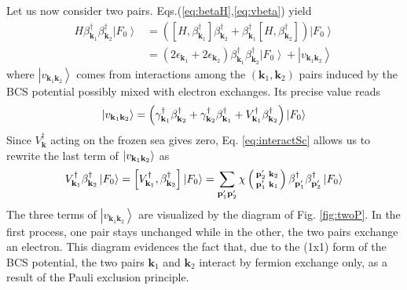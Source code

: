 \documentclass[aps,prb,superscriptaddress,twocolumn]{revtex4}
\newcommand{\vk}{\ensuremath{\mathbf{k}}}
\newcommand{\vp}{\ensuremath{\mathbf{p}}}
\begin{document}
Let us now consider two pairs. Eqs.(\ref{eq:betaH},\ref{eq:vbeta}) yield 
\begin{equation}  \label{eq:SchTwo}
\begin{split}
H\beta^{\dagger}_{\mathbf{k} _1}\beta^{\dagger}_{\mathbf{k}
_2}\left|F_0\right>   &=\left(\left[H,\beta^{\dagger}_{\mathbf{k} _1}\right]
\beta^{\dagger}_{\mathbf{k} _2}+\beta^{\dagger}_{\mathbf{k} _1}\left[%
H,\beta^{\dagger}_{\mathbf{k} _2}\right]  \right) \left|F_0\right>   \\
&=\left(2\epsilon_{\mathbf{k} _1}+2\epsilon_{\mathbf{k} _2}\right)
\beta^{\dagger}_{\mathbf{k} _1}\beta^{\dagger}_{\mathbf{k}
_2}\left|F_0\right>  +\left|v_{\mathbf{k} _1\mathbf{k} _2}\right> 
\end{split}%
\end{equation}
where $\left|v_{\mathbf{k} _1\mathbf{k} _2}\right> $ comes from interactions
among the $\left(\mathbf{k} _1,\mathbf{k} _2\right) $ pairs induced by the
BCS potential possibly mixed with electron exchanges. Its precise value reads 
\begin{equation}
\left|v_{\mathbf{k} _1\mathbf{k} _2}\right> =\left(\gamma^{\dagger}_{\mathbf{%
k} _1}\beta^{\dagger}_{\mathbf{k} _2}+\gamma^{\dagger}_{\mathbf{k}
_2}\beta^{\dagger}_{\mathbf{k} _1}+V^{\dagger}_{\mathbf{k}
_1}\beta^{\dagger}_{\mathbf{k} _2}\right) \left|F_0\right>  
\end{equation}
Since $V^{\dagger}_{\mathbf{k}}$ acting on the frozen sea gives zero,  Eq. \eqref{eq:interactSc} allows us to rewrite the last term of $\left|v_{%
\mathbf{k} _1\mathbf{k} _2}\right> $ as 
\begin{equation}
V^{\dagger}_{\mathbf{k} _1}\beta^{\dagger}_{\mathbf{k} _2}\left|F_0\right>  =%
\left[V^{\dagger}_{\mathbf{k} _1},\beta^{\dagger}_{\mathbf{k} _2}\right] 
\left|F_0\right>  = \sum_{\mathbf{p} ^{\prime}_1\mathbf{p}
^{\prime}_2}\chi\left(\begin{smallmatrix}\vp'_2&\vk_2\\\vp'_1&\vk_1%
\end{smallmatrix}\right)  \beta^{\dagger}_{\mathbf{p} ^{\prime}_1}\beta^{%
\dagger}_{\mathbf{p} ^{\prime}_2}\left|F_0\right>  
\end{equation}
The three terms of  $\left|v_{\mathbf{k} _1\mathbf{k} _2}\right> $ are visualized by
the diagram of Fig. \ref{fig:twoP}. In the first process, one pair stays unchanged while in the other, the two pairs exchange an electron. This diagram evidences the fact that,
due to the (1x1) form of the BCS potential, the two pairs $\mathbf{k} _1$
and $\mathbf{k} _2$ interact by fermion exchange only, as a result of the
Pauli exclusion principle.
\end{document}
